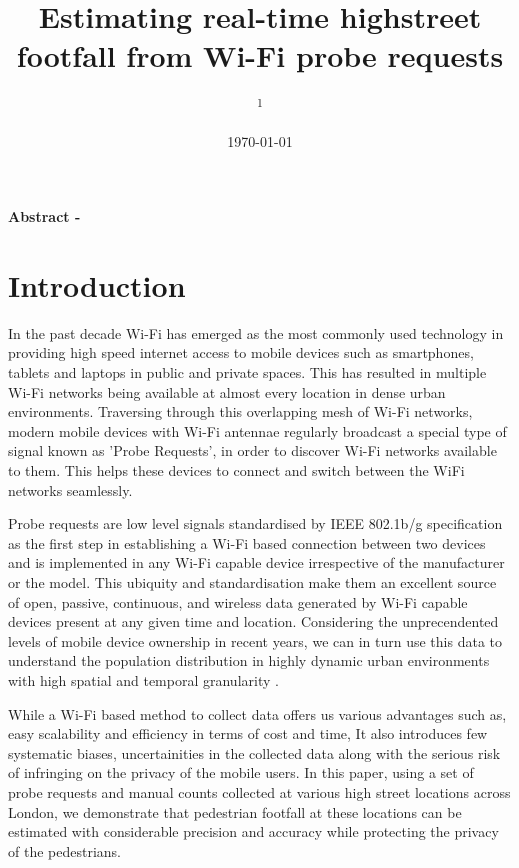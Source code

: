 \documentclass[11t, a4paper, twocolumn]{article}
\title{Estimating real-time highstreet footfall from Wi-Fi probe requests}
\author{
	\authorstyle{
		Balamurugan Soundararaj\textsuperscript{1}, 
		James Cheshire\textsuperscript{1} and 
		Paul Longley\textsuperscript{1}}
	\newline\newline
	\textsuperscript{1}\institution{
		Department of Geography, 
		University College London, 
		United Kingdom}
}
\date{\today}
\begin{document}
	\maketitle
	\thispagestyle{firstpage}
	
	\textbf{Abstract -} \lipsum[1]

	\section{Introduction}\label{intro}

		In the past decade Wi-Fi has emerged as the most commonly used technology in providing high speed internet access to mobile devices such as smartphones, tablets and laptops in public and private spaces. This has resulted in multiple Wi-Fi networks being available at almost every location in dense urban environments. Traversing through this overlapping mesh of Wi-Fi networks, modern mobile devices with Wi-Fi antennae regularly broadcast a special type of signal known as 'Probe Requests', in order to discover Wi-Fi networks available to them. This helps these devices to connect and switch between the WiFi networks seamlessly.
		
		Probe requests are low level signals standardised by IEEE 802.1b/g specification as the first step in establishing a Wi-Fi based connection between two devices and is implemented in any Wi-Fi capable device irrespective of the manufacturer or the model. This ubiquity and standardisation make them an excellent source of open, passive, continuous, and wireless data generated by Wi-Fi capable devices present at any given time and location. Considering the unprecendented levels of mobile device ownership in recent years, we can in turn use this data to understand the population distribution in highly dynamic urban environments with high spatial and temporal granularity \citep{freud2015,konto2017}.

		While a Wi-Fi based method to collect data offers us various advantages such as, easy scalability and efficiency in terms of cost and time, It also introduces few systematic biases, uncertainities in the collected data along with the serious risk of infringing on the privacy of the mobile users. In this paper, using a set of probe requests and manual counts collected at various high street locations across London, we demonstrate that pedestrian footfall at these locations can be estimated with considerable precision and accuracy while protecting the privacy of the pedestrians.
\end{document}
